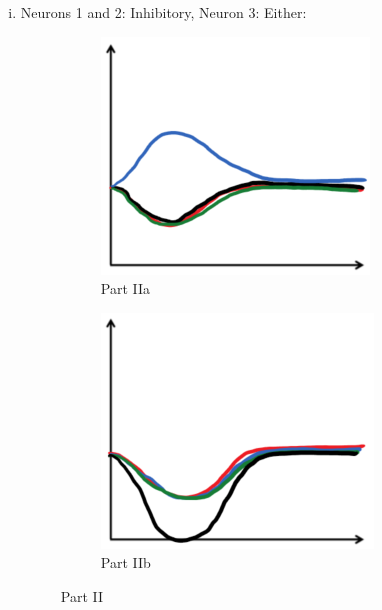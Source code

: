 \documentclass{article}
\begin{document}
\begin{enumerate}[A.]
\begin{enumerate}[i.]
            \item Neurons 1 and 2: Inhibitory, Neuron 3: Either:
                \begin{figure}[H]
                    \centering
                    \begin{subfigure}{.5\textwidth}
                        \centering
                        \includegraphics[width=.75\linewidth]{"Part IIa"}
                        \caption{Part IIa}
                    \end{subfigure}%
                    \begin{subfigure}{.5\textwidth}
                        \centering
                        \includegraphics[width=.75\linewidth]{"Part IIb"}
                        \caption{Part IIb}
                    \end{subfigure}
                    \caption{Part II}
                \end{figure}
          

\end{enumerate}
\end{enumerate}
\end{document}
